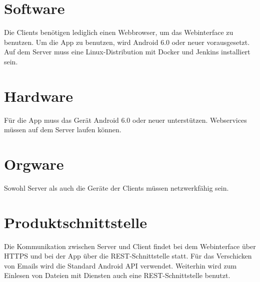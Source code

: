 \section{Software}

Die Clients benötigen lediglich einen Webbrowser, um das Webinterface zu benutzen. Um die App zu benutzen, wird Android 6.0 oder neuer vorausgesetzt.
\newline
\newline
Auf dem Server muss eine Linux-Distribution mit Docker und Jenkins installiert sein.

\section{Hardware}

Für die App muss das Gerät Android 6.0 oder neuer unterstützen.
\newline
\newline
Webservices müssen auf dem Server laufen können.


\section{Orgware}

Sowohl Server als auch die Geräte der Clients müssen netzwerkfähig sein.


\section{Produktschnittstelle}

Die Kommunikation zwischen Server und Client findet bei dem Webinterface über HTTPS und bei der App über die REST-Schnittstelle statt. Für das Verschicken von Emails wird die Standard Android API verwendet. Weiterhin wird zum Einlesen von Dateien mit Diensten auch eine REST-Schnittstelle benutzt.
